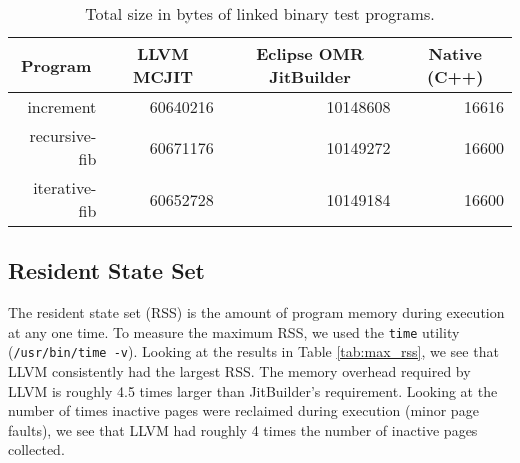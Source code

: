 \begin{table*}[t]
  \begin{tabular}{|r|l|l|l|} 
  \hline
  \multicolumn{1}{|c|}{\textbf{Program}}
  & \multicolumn{1}{c|}{\textbf{LLVM MCJIT}}                      
  & \multicolumn{1}{c|}{\textbf{Eclipse OMR JitBuilder}}
  & \multicolumn{1}{c|}{\textbf{Native (C++)}}                    
  \\ \hline

  increment                               
  & \multicolumn{1}{r|}{\num{60640216}} %
  & \multicolumn{1}{r|}{\num{10148608}} %
  & \multicolumn{1}{r|}{\num{16616}}    %
  \\ \hline
  
  recursive-fib                           
  & \multicolumn{1}{r|}{\num{60671176}} %
  & \multicolumn{1}{r|}{\num{10149272}} %
  & \multicolumn{1}{r|}{\num{16600}}   %
  \\ \hline
  
  iterative-fib                           
  & \multicolumn{1}{r|}{\num{60652728}} %
  & \multicolumn{1}{r|}{\num{10149184}} %
  & \multicolumn{1}{r|}{\num{16600}}   %
  \\ \hline
  
\end{tabular}
  \caption{Total size in bytes of linked binary test programs.}
  \label{tab:size_in_bytes}
\end{table*}

\subsection{Resident State Set}
The resident state set (RSS) is the amount of program memory during execution at any one time.
To measure the maximum RSS, we used the \texttt{time} utility (\texttt{/usr/bin/time -v}).
Looking at the results in Table \ref{tab:max_rss}, we see that LLVM consistently had the largest RSS.
The memory overhead required by LLVM is roughly 4.5 times larger than JitBuilder's requirement.
Looking at the number of times inactive pages were reclaimed during execution (minor page faults), we see that LLVM had roughly 4 times the number of inactive pages collected.

